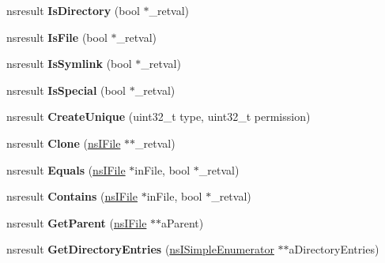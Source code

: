 \begin{DoxyCompactItemize}
\item 
\mbox{\label{interfacens_i_file_a16fa987cb2f4f51f17431195dfdad61e}} 
nsresult {\bfseries Is\+Directory} (bool $\ast$\+\_\+retval)
\item 
\mbox{\label{interfacens_i_file_a764069537b59ecd057b7a19f87801845}} 
nsresult {\bfseries Is\+File} (bool $\ast$\+\_\+retval)
\item 
\mbox{\label{interfacens_i_file_a90774b2e11d8ac14de15c9b867fc0cd9}} 
nsresult {\bfseries Is\+Symlink} (bool $\ast$\+\_\+retval)
\item 
\mbox{\label{interfacens_i_file_a024b1279f05c0b0ab4e1478c0fae8071}} 
nsresult {\bfseries Is\+Special} (bool $\ast$\+\_\+retval)
\item 
\mbox{\label{interfacens_i_file_ad28de0a16ccd16e4f669bd0ac436f821}} 
nsresult {\bfseries Create\+Unique} (uint32\+\_\+t type, uint32\+\_\+t permission)
\item 
\mbox{\label{interfacens_i_file_a51bc96dd4ace5032da690815c41090ce}} 
nsresult {\bfseries Clone} (\hyperlink{interfacens_i_file}{ns\+I\+File} $\ast$$\ast$\+\_\+retval)
\item 
\mbox{\label{interfacens_i_file_ab0c0716b33d9069a8ef1791509c60a9f}} 
nsresult {\bfseries Equals} (\hyperlink{interfacens_i_file}{ns\+I\+File} $\ast$in\+File, bool $\ast$\+\_\+retval)
\item 
\mbox{\label{interfacens_i_file_a1ce57332d9ecedfeeaea12cec1579c99}} 
nsresult {\bfseries Contains} (\hyperlink{interfacens_i_file}{ns\+I\+File} $\ast$in\+File, bool $\ast$\+\_\+retval)
\item 
\mbox{\label{interfacens_i_file_ae9edffe207f0619300c590472514b5ec}} 
nsresult {\bfseries Get\+Parent} (\hyperlink{interfacens_i_file}{ns\+I\+File} $\ast$$\ast$a\+Parent)
\item 
\mbox{\label{interfacens_i_file_a45bdb4da8c173e9526093fe3734d536a}} 
nsresult {\bfseries Get\+Directory\+Entries} (\hyperlink{interfacens_i_simple_enumerator}{ns\+I\+Simple\+Enumerator} $\ast$$\ast$a\+Directory\+Entries)
$$
\end{DoxyCompactItemize}
